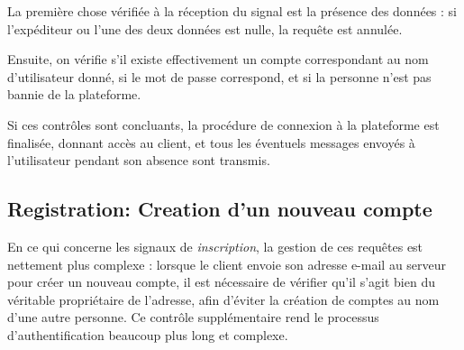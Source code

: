 \documentclass[12pt]{report}
\begin{document}
La première chose vérifiée à la réception du signal est la présence des données : si l’expéditeur ou l’une des deux données est nulle, la requête est annulée.

Ensuite, on vérifie s’il existe effectivement un compte correspondant au nom d’utilisateur donné, si le mot de passe correspond, et si la personne n’est pas bannie de la plateforme.

Si ces contrôles sont concluants, la procédure de connexion à la plateforme est finalisée, donnant accès au client, et tous les éventuels messages envoyés à l’utilisateur pendant son absence sont transmis.

\subsection{Registration: Creation d'un nouveau compte}

En ce qui concerne les signaux de \textit{inscription}, la gestion de ces requêtes est nettement plus complexe : lorsque le client envoie son adresse e-mail au serveur pour créer un nouveau compte, il est nécessaire de vérifier qu’il s’agit bien du véritable propriétaire de l’adresse, afin d’éviter la création de comptes au nom d’une autre personne. Ce contrôle supplémentaire rend le processus d’authentification beaucoup plus long et complexe.
\end{document}
